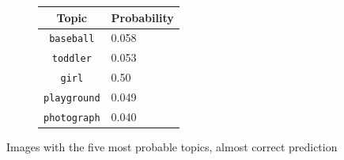 \documentclass[twoside,twocolumn]{article}
\begin{document}
\begin{figure}
\begin{subfigure}{\textwidth}
\begin{minipage}[t][4cm]{.5\linewidth}
    \end{minipage}\hfill
    \begin{minipage}[t]{.5\textwidth}
    \centering
    \vspace{0pt}
    \begin{tabular}{cl}
            Topic                           & Probability\\
            \hline
            \texttt{baseball}             & 0.058 \\
            \texttt{toddler}                   & 0.053 \\
            \texttt{girl}                 & 0.50 \\
            \texttt{playground}           & 0.049 \\
            \texttt{photograph}        & 0.040\\
            \hline
        \end{tabular}
    \end{minipage}
\end{subfigure}
\caption{Images with the five most probable topics, almost correct prediction}
\label{fig:predsemi}
\end{figure}
\end{document}

